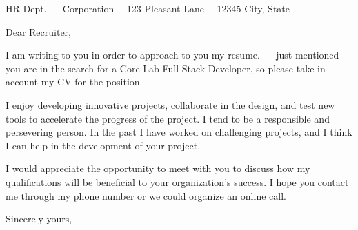 \documentclass{scrlttr2}
\renewcommand{\\}{\ {\large\textperiodcentered}\ }
\begin{document}

\begin{letter}{ %
HR Dept. --- Corporation\\
123 Pleasant Lane\\
12345 City, State
}


\opening{Dear Recruiter,}

I am writing to you in order to approach to you my resume. --- just mentioned you are in the search for a Core Lab Full Stack Developer, so please take in account my CV for the position.\\

I enjoy developing innovative projects, collaborate in the design, and test new tools to accelerate the progress of the project. I tend to be a responsible and persevering person. In the past I have worked on challenging projects, and I think I can help in the development of your project.\\

I would appreciate the opportunity to meet with you to discuss how my qualifications will be beneficial to your organization’s success. I hope you contact me through my phone number  or we could organize an online call.\\

Sincerely yours, \\ \\ \\


\end{letter}
\end{document}
